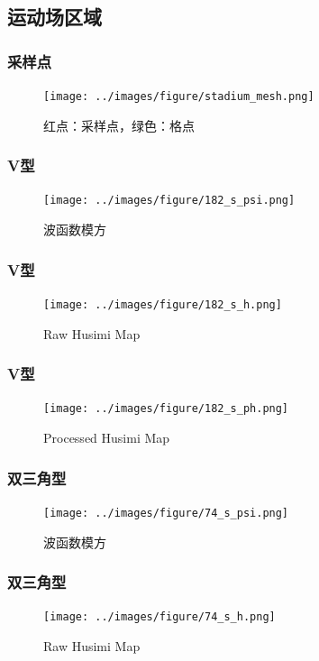 \documentclass[UTF8]{beamer}
\begin{document}
\subsection{运动场区域}

\begin{frame}
    \frametitle{采样点}

    \begin{figure}
        \centering
        \texttt{[image: ../images/figure/stadium\_mesh.png]}
        \caption{红点：采样点，绿色：格点}
    \end{figure}

\end{frame}

\begin{frame}
    \frametitle{V型}
    \begin{figure}
        \centering
        \texttt{[image: ../images/figure/182\_s\_psi.png]}
        \caption{波函数模方}
    \end{figure}
\end{frame}

\begin{frame}
    \frametitle{V型}
    \begin{figure}
        \centering
        \texttt{[image: ../images/figure/182\_s\_h.png]}
        \caption{Raw Husimi Map}
    \end{figure}
\end{frame}

\begin{frame}
    \frametitle{V型}
    \begin{figure}
        \centering
        \texttt{[image: ../images/figure/182\_s\_ph.png]}
        \caption{Processed Husimi Map}
    \end{figure}
\end{frame}

\begin{frame}
    \frametitle{双三角型}
    \begin{figure}
        \centering
        \texttt{[image: ../images/figure/74\_s\_psi.png]}
        \caption{波函数模方}
    \end{figure}
\end{frame}

\begin{frame}
    \frametitle{双三角型}
    \begin{figure}
        \centering
        \texttt{[image: ../images/figure/74\_s\_h.png]}
        \caption{Raw Husimi Map}
    \end{figure}
\end{frame}
\end{document}
